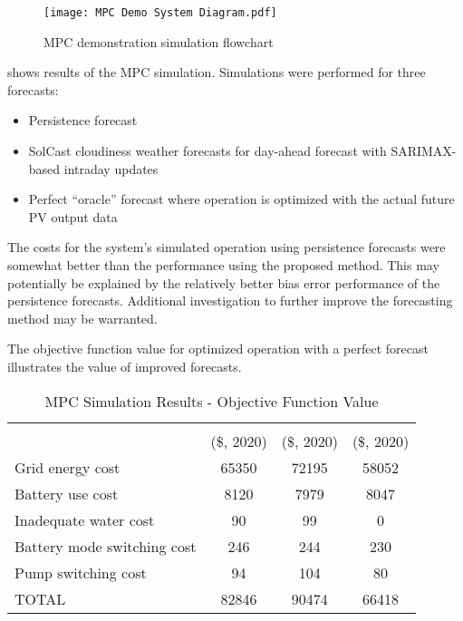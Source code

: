 \begin{figure}[tbh]
	\centering
	\texttt{[image: MPC Demo System Diagram.pdf]}
	\caption{MPC demonstration simulation flowchart}
	\label{fig:mpc-simulation-flowchart}
\end{figure}

 shows results of the MPC simulation. Simulations were performed for three forecasts:
\begin{itemize}
\item Persistence forecast
\item SolCast cloudiness weather forecasts for day-ahead forecast with SARIMAX-based intraday updates
\item Perfect ``oracle'' forecast where operation is optimized with the actual future PV output data
\end{itemize}
The costs for the system's simulated operation using persistence forecasts were somewhat better than the performance using the proposed method.
This may potentially be explained by the relatively better bias error performance of the persistence forecasts.
Additional investigation to further improve the forecasting method may be warranted.

The objective function value for optimized operation with a perfect forecast illustrates the value of improved forecasts.

\begin{table}
	\caption{MPC Simulation Results - Objective Function Value}
	\label{table:mpc-simulation-results}
	\centering
	\begin{tabular}{lS[table-format=5]S[table-format=5]S[table-format=5]}
		\toprule
          & {} & {} & {} \\
		  & {(\$, 2020)} & {(\$, 2020)}                    & {(\$, 2020)} \\
		\midrule
		Grid energy cost            & 65350 & 72195 & 58052 \\
		Battery use cost            &  8120 &  7979 &  8047 \\
		Inadequate water cost       &    90 &    99 &     0 \\
		Battery mode switching cost &   246 &   244 &   230 \\
		Pump switching cost         &    94 &   104 &    80 \\
		\midrule
		TOTAL                       & 82846 & 90474 & 66418 \\
		\bottomrule
	\end{tabular}
\end{table}

